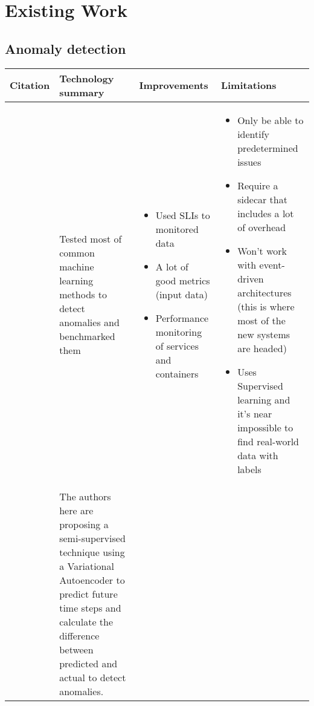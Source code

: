 

{\let\clearpage\relax\chapter{Existing Work}}

\section{Anomaly detection}


\begin{longtable}{| p{20mm} | p{43mm} | p{43mm} | p{43mm} |}
\hline
  \textbf{Citation} &
  \textbf{Technology summary} &
  \textbf{Improvements} &
  \textbf{Limitations} \\ \hline
  \cite{du2018anomaly} &
  Tested most of common machine learning methods to detect anomalies and benchmarked them &
  \vspace{-8mm}
  \begin{itemize}[leftmargin=*,noitemsep,nolistsep] 
    \item Used SLIs to monitored data
    \item A lot of good metrics (input data)
    \item Performance monitoring of services and containers
  \vspace{-7mm}
  \end{itemize} &
  \vspace{-8mm}
  \begin{itemize}[leftmargin=*,noitemsep,nolistsep] 
    \item Only be able to identify predetermined issues
    \item Require a sidecar that includes a lot of overhead
    \item Won't work with event-driven architectures (this is where most of the new systems are headed)
    \item Uses Supervised learning and it's near impossible to find real-world data with labels
  \vspace{-7mm}
  \end{itemize} \\ \hline
  \cite{kumarage2018anomaly} &
  The authors here are proposing a semi-supervised technique using a Variational Autoencoder to predict future time steps and calculate the difference between predicted and actual to detect anomalies. &

\end{longtable}
